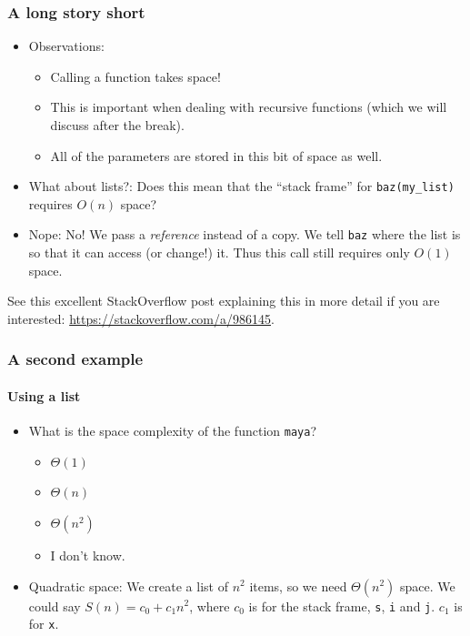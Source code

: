 \begin{frame}
	\frametitle{A long story short}
	
		\begin{itemize}
		\item Observations:
	\begin{itemize}
		\item Calling a function takes space!
		\item This is important when dealing with recursive functions (which we will discuss after the break).
		\item All of the parameters are stored in this bit of space as well.
	\end{itemize}
	
		\item What about lists?:
		Does this mean that the ``stack frame'' for \texttt{baz(my\_list)} requires $O(n)$ space?
	
		\item Nope:
		No! We pass a \textit{reference} instead of a copy. We tell \texttt{baz} where the list is so that it can
		access (or change!) it. Thus this call still requires only $O(1)$ space.\\
	\end{itemize}

		{\scriptsize
		See this excellent StackOverflow post explaining this in more detail if you are interested:
	\url{https://stackoverflow.com/a/986145}.}
\end{frame}

\begin{frame}
	\frametitle{A second example}
	\framesubtitle{Using a list}
	
			\begin{itemize}
				\item What is the space complexity of the function \texttt{maya}?
			\begin{itemize}
				\item $\Theta(1)$
				\item $\Theta(n)$ 
				\item $\Theta(n^2)$
				\item I don't know.
			\end{itemize}
	
				\item Quadratic space:
		We create a list of $n^2$ items, so we need $\Theta(n^2)$ space. We could say $S(n) = c_0 + c_1n^2$, where $c_0$ is
		for the stack frame, \texttt{s}, \texttt{i} and \texttt{j}. $c_1$ is for \texttt{x}.
	\end{itemize}
	


\end{frame}

